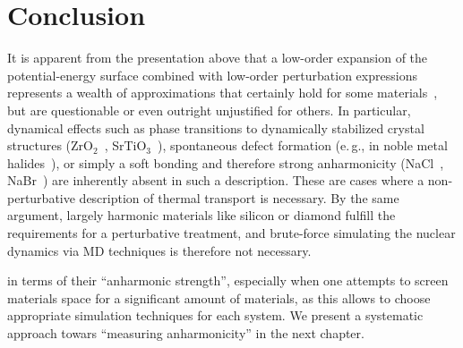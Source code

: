 \section{Conclusion}
It is apparent from the presentation above that a low-order expansion of the potential-energy surface combined with low-order perturbation expressions represents a wealth of approximations that certainly hold for some materials~\cite{Ladd1986,Broido2007,Puligheddu2019}, but are questionable or even outright unjustified for others. In particular, dynamical effects such as phase transitions to dynamically stabilized crystal structures (ZrO$_2$~\cite{Carbogno2014,Carbogno2016}, SrTiO$_3$~\cite{Tadano2015}), spontaneous defect formation (e.\,g., in noble metal halides~\cite{Ulrich1999,Brenner2020}), or simply a soft bonding and therefore strong anharmonicity (NaCl~\cite{Ravichandran2018}, NaBr~\cite{Shen2020}) are inherently absent in such a description. These are cases where a non-perturbative description of thermal transport is necessary. By the same argument, largely harmonic materials like silicon or diamond fulfill the requirements for a perturbative treatment, and brute-force simulating the nuclear dynamics via MD techniques is therefore not necessary.

 in terms of their ``anharmonic strength'', especially when one attempts to screen materials space for a significant amount of materials, as this allows to choose appropriate simulation techniques for each system. We present a systematic approach towars ``measuring anharmonicity'' in the next chapter.
